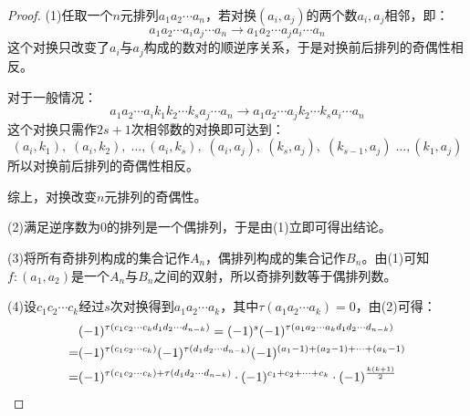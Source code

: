 \begin{proof}
	(1)任取一个$n$元排列$a_1a_2\cdots a_n$，若对换$(a_i,a_j)$的两个数$a_i,a_j$相邻，即：
	\begin{equation*}
		a_1a_2\cdots a_ia_j\cdots a_n\longrightarrow a_1a_2\cdots a_ja_i\cdots a_n
	\end{equation*}
	这个对换只改变了$a_i$与$a_j$构成的数对的顺逆序关系，于是对换前后排列的奇偶性相反。\par
	对于一般情况：
	\begin{equation*}
		a_1a_2\cdots a_ik_1k_2\cdots k_sa_j\cdots a_n\longrightarrow a_1a_2\cdots a_jk_2\cdots k_sa_i\cdots a_n
	\end{equation*}
	这个对换只需作$2s+1$次相邻数的对换即可达到：
	\begin{equation*}
		(a_i,k_1),\;(a_i,k_2),\;\dots,(a_i,k_s),\;(a_i,a_j),\;(k_s,a_j),\;(k_{s-1},a_j)\;\dots,(k_1,a_j)
	\end{equation*}
	所以对换前后排列的奇偶性相反。\par
	综上，对换改变$n$元排列的奇偶性。\par
	(2)满足逆序数为$0$的排列是一个偶排列，于是由(1)立即可得出结论。\par
	(3)将所有奇排列构成的集合记作$A_n$，偶排列构成的集合记作$B_n$。由(1)可知$f:(a_1,a_2)$是一个$A_n$与$B_n$之间的双射，所以奇排列数等于偶排列数。\par
	(4)设$c_1c_2\cdots c_k$经过$s$次对换得到$a_1a_2\cdots a_k$，其中$\tau(a_1a_2\cdots a_k)=0$，由(2)可得：
	\begin{align*}
		&(-1)^{\tau(c_1c_2\cdots c_kd_1d_2\cdots d_{n-k})}=(-1)^s(-1)^{\tau(a_1a_2\cdots a_kd_1d_2\cdots d_{n-k})} \\
		=&(-1)^{\tau(c_1c_2\cdots c_k)}(-1)^{\tau(d_1d_2\cdots d_{n-k})}(-1)^{(a_1-1)+(a_2-1)+\cdots+(a_k-1)} \\
		=&(-1)^{\tau(c_1c_2\cdots c_k)+\tau(d_1d_2\cdots d_{n-k})}\cdot(-1)^{c_1+c_2+\cdots+c_k}\cdot(-1)^{\frac{k(k+1)}{2}}\qedhere
	\end{align*}
\end{proof}
